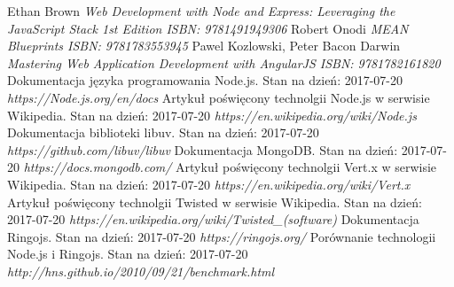 \documentclass[12pt]{report}
\begin{document}
\begin{thebibliography}{99}
Ethan Brown
\textit{Web Development with Node and Express: Leveraging the JavaScript Stack 1st Edition ISBN: 9781491949306}
Robert Onodi
\textit{MEAN Blueprints ISBN: 9781783553945}
Pawel Kozlowski, Peter Bacon Darwin
\textit{Mastering Web Application Development with AngularJS ISBN: 9781782161820}
Dokumentacja języka programowania Node.js. Stan na dzień: 2017-07-20
\textit{https://Node.js.org/en/docs}
Artykuł poświęcony technolgii Node.js w serwisie Wikipedia. Stan na dzień: 2017-07-20
\textit{https://en.wikipedia.org/wiki/Node.js}
Dokumentacja biblioteki libuv. Stan na dzień: 2017-07-20
\textit{https://github.com/libuv/libuv}
Dokumentacja MongoDB. Stan na dzień: 2017-07-20
\textit{https://docs.mongodb.com/}
Artykuł poświęcony technolgii Vert.x w serwisie Wikipedia. Stan na dzień: 2017-07-20
\textit{https://en.wikipedia.org/wiki/Vert.x}
Artykuł poświęcony technolgii Twisted w serwisie Wikipedia. Stan na dzień: 2017-07-20
\textit{https://en.wikipedia.org/wiki/Twisted\_(software)}
Dokumentacja Ringojs. Stan na dzień: 2017-07-20
\textit{https://ringojs.org/}
Porównanie technologii Node.js i Ringojs. Stan na dzień: 2017-07-20
\textit{http://hns.github.io/2010/09/21/benchmark.html}
\end{thebibliography}
\listoffigures
\end{document}
